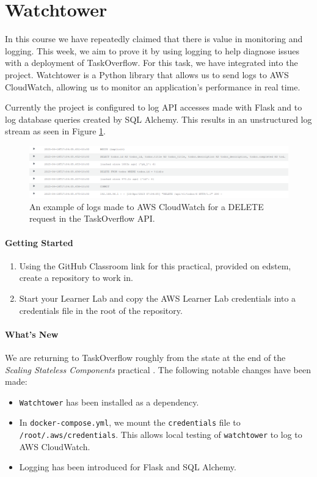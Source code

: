 \documentclass{csse4400}
\begin{document}
\section{Watchtower}
In this course we have repeatedly claimed that there is value in monitoring and logging.
This week, we aim to prove it by using logging to help diagnose issues with a deployment of TaskOverflow.
For this task, we have integrated  into the project.
Watchtower is a Python library that allows us to send logs to AWS CloudWatch,
allowing us to monitor an application's performance in real time.

Currently the project is configured to log API accesses made with Flask and to log database queries created by SQL Alchemy.
This results in an unstructured log stream as seen in Figure \ref{fig:cloud-logs}.

\begin{figure}[ht]
    \centering
    \begin{adjustwidth}{-7.5mm}{-7.5mm}
        \includegraphics[width=0.95\paperwidth]{images/cloud-watch-log}
    \end{adjustwidth}
    \caption{An example of logs made to AWS CloudWatch for a DELETE request in the TaskOverflow API.}
    \label{fig:cloud-logs}
\end{figure}

\paragraph{Getting Started}
\begin{enumerate}
    \item Using the GitHub Classroom link for this practical, provided on edstem, create a repository to work in.
    \item Start your Learner Lab and copy the AWS Learner Lab credentials into a credentials file in the root of the repository.
\end{enumerate}

\paragraph{What's New}
We are returning to TaskOverflow roughly from the state at the end of the
\textit{Scaling Stateless Components} practical \cite{prac-week6}.
The following notable changes have been made:
\begin{itemize}
    \item \texttt{Watchtower} has been installed as a dependency.
    \item In \texttt{docker-compose.yml}, we mount the \texttt{credentials} file to \texttt{/root/.aws/credentials}.
        This allows local testing of \texttt{watchtower} to log to AWS CloudWatch.
    \item Logging has been introduced for Flask and SQL Alchemy.
\end{itemize}
\end{document}
